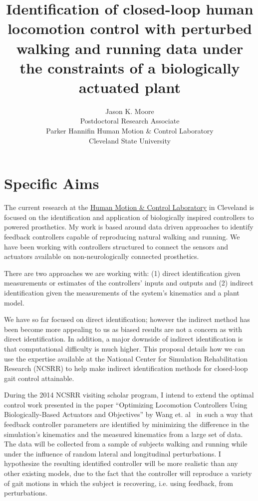 \documentclass[11pt]{article}
\title{Identification of closed-loop human locomotion control with perturbed
walking and running data under the constraints of a biologically actuated
plant}
\author{Jason K. Moore\\
  Postdoctoral Research Associate\\
  Parker Hannifin Human Motion \& Control Laboratory\\
  Cleveland State University
}
\begin{document}
\maketitle

\section*{Specific Aims}

The current research at the \href{http://hmc.csuohio.edu}{Human Motion \&
Control Laboratory} in Cleveland is focused on the identification and
application of biologically inspired controllers to powered prosthetics. My
work is based around data driven approaches to identify feedback controllers
capable of reproducing natural walking and running. We have been working with
controllers structured to connect the sensors and actuators available on
non-neurologically connected prosthetics.

There are two approaches we are working with: (1) direct identification given
measurements or estimates of the controllers' inputs and outputs and (2)
indirect identification given the measurements of the system's kinematics and a
plant model.

We have so far focused on direct identification; however the indirect method
has been become more appealing to us as biased results are not a concern
as with direct identification. In addition, a major downside of indirect identification is
that computational difficulty is much higher. This proposal details how we
can use the expertise available at the National Center for Simulation
Rehabilitation Research (NCSRR) to help make indirect identification methods
for closed-loop gait control attainable.

During the 2014 NCSRR visiting scholar program, I intend to extend the optimal
control work presented in the paper ``Optimizing Locomotion Controllers Using
Biologically-Based Actuators and Objectives'' by Wang et. al~\cite{Wang2012} in
such a way that feedback controller parameters are identified by minimizing the
difference in the simulation's kinematics and the measured kinematics from a
large set of data. The data will be collected from a sample of subjects walking
and running while under the influence of random lateral and longitudinal
perturbations. I hypothesize the resulting identified controller will be
more realistic than any other existing models, due to the fact that the
controller will reproduce a variety of gait motions in which the subject is
recovering, i.e. using feedback, from perturbations.
\end{document}
